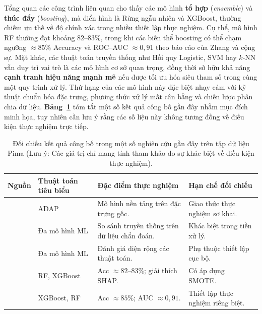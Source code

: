 \documentclass[14pt,a4paper]{extreport}
\begin{document}
Tổng quan các công trình liên quan cho thấy các mô hình \textbf{tổ hợp} (\textit{ensemble}) và \textbf{thúc đẩy} (\textit{boosting}), mà điển hình là Rừng ngẫu nhiên và XGBoost, thường chiếm ưu thế về độ chính xác trong nhiều thiết lập thực nghiệm. Cụ thể, mô hình RF thường đạt khoảng $82$--$83\%$, trong khi các biến thể boosting có thể chạm ngưỡng $\approx 85\%$ Accuracy và ROC--AUC $\approx 0{,}91$ theo báo cáo của Zhang và cộng sự.\cite{kirbas2025shap,zhang2025pima} Mặt khác, các thuật toán truyền thống như Hồi quy Logistic, SVM hay $k$-NN vẫn duy trì vai trò là các mô hình cơ sở quan trọng, đồng thời sở hữu khả năng \textbf{cạnh tranh hiệu năng mạnh mẽ} nếu được tối ưu hóa siêu tham số trong cùng một quy trình xử lý. Thứ hạng của các mô hình này đặc biệt nhạy cảm với kỹ thuật chuẩn hóa đặc trưng, phương thức xử lý mất cân bằng và chiến lược phân chia dữ liệu.\cite{chang2022pima,sisodia2018,miao2021pima} \textbf{Bảng~\ref{tab:related-numbers}} tóm tắt một số kết quả công bố gần đây nhằm mục đích minh họa, tuy nhiên cần lưu ý rằng các số liệu này không tương đồng về điều kiện thực nghiệm trực tiếp.

\begin{table}[htbp]
  \centering
  \caption{Đối chiếu kết quả công bố trong một số nghiên cứu gần đây trên tập dữ liệu Pima (Lưu ý: Các giá trị chỉ mang tính tham khảo do sự khác biệt về điều kiện thực nghiệm).}
  \label{tab:related-numbers}
  \small
  \setlength{\tabcolsep}{4pt}
  \begin{tabular}{llp{4.5cm}p{4cm}}
    \toprule
    Nguồn & Thuật toán tiêu biểu & Đặc điểm thực nghiệm & Hạn chế đối chiếu \\
    \midrule
    \cite{smith1988} & ADAP & Mô hình nền tảng trên đặc trưng gốc. & Giao thức thực nghiệm sơ khai. \\
    \cite{sisodia2018} & Đa mô hình ML & So sánh truyền thống trên dữ liệu chẩn đoán. & Khác biệt trong tiền xử lý. \\
    \cite{chang2022pima} & Đa mô hình ML & Đánh giá diện rộng các thuật toán. & Phụ thuộc thiết lập cục bộ. \\
    \cite{kirbas2025shap} & RF, XGBoost & Acc $\approx 82$--$83\%$; giải thích SHAP. & Có áp dụng SMOTE. \\
    \cite{zhang2025pima} & XGBoost, RF & Acc $\approx 85\%$; AUC $\approx 0{,}91$. & Thiết lập thực nghiệm riêng biệt. \\
    \bottomrule
  \end{tabular}
\end{table}
\end{document}
